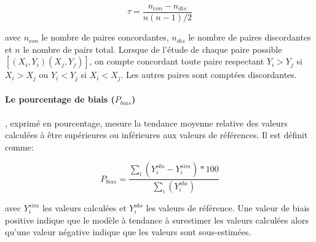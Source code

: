 \begin{equation}
    \tau = \frac{n_{con}-n_{dis}}{n(n-1)/2}
\end{equation}

avec $n_{con}$ le nombre de paires concordantes, $n_{dis}$ le nombre de paires discordantes et $n$ le nombre de pairs total. Lorsque de l'étude de chaque paire possible $[(X_i,Y_i)(X_j,Y_j)]$, on compte concordant toute paire respectant $Y_i>Y_j$ si $X_i>X_j$ ou $Y_i<Y_j$ si $X_i<X_j$. Les autres paires sont comptées discordantes.


\paragraph{Le pourcentage de biais ($P_{bias}$)}, exprimé en pourcentage, mesure la tendance moyenne relative des valeurs calculées à être supérieures ou inférieures aux valeurs de références. Il est définit comme:

\begin{equation}
    P_{bias} = \frac{\sum_i(Y_{i}^{obs}-Y_{i}^{sim})*100}{\sum_i(Y_{i}^{obs})}
\end{equation}

avec $Y_{i}^{sim}$ les valeurs calculées et $Y_{i}^{obs}$ les valeurs de référence. Une valeur de biais positive indique que le modèle à tendance à surestimer les valeurs calculées alors qu'une valeur négative indique que les valeurs sont sous-estimées.
